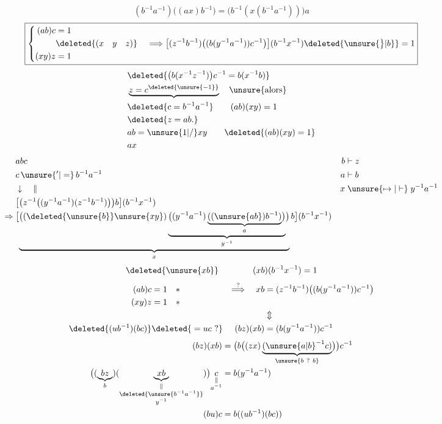 \[
\boxed{(b^{-1}a^{-1})\bigl((ax)b^{-1}\bigr)
=\bigl(b^{-1}(x(b^{-1}a^{-1}))\bigr)a}
\]
\[
\boxed{\left\{\begin{aligned}
(ab)c&=1\\
&\deleted{(x\quad y\quad z)}\\
(xy)z&=1
\end{aligned}\right.\quad\Longrightarrow
\bigl[(z^{-1}b^{-1})\bigl((b(y^{-1}a^{-1}))c^{-1}\bigr)\bigr](b^{-1}x^{-1})\deleted{\unsure{\big\}|b}}=1}
\]
\[
\begin{aligned}
&\deleted{\bigl(b(x^{-1}z^{-1})\bigr)c^{-1}=b(x^{-1}b)}\\
&\underbrace{z=c^{\deleted{\unsure{-1}}}}\quad\unsure{\text{alors}}\\
&\deleted{c=b^{-1}a^{-1}}\qquad(ab)(xy)=1\\
&\deleted{z=ab.}\\
&ab=\unsure{1|/}xy\qquad\deleted{(ab)(xy)=1}\\
&ax
\end{aligned}
\]
\[
\begin{aligned}
&abc&b&\mathrel{\vdash}z\\
&c\,\unsure{{}^{\prime}|=}\,b^{-1}a^{-1}&a&\mathrel{\vdash}b\\
&\downarrow\quad\|&x&\mathrel{\unsure{\mapsto|\vdash}}y^{-1}a^{-1}\\
&\bigl[\bigl(z^{-1}\bigl((y^{-1}a^{-1})(z^{-1}b^{-1})\bigr)\bigr)b\bigr](b^{-1}x^{-1})\\
\Rightarrow{}&
\bigl[\underbrace{\bigl((\deleted{\unsure{b}}\unsure{xy})\underbrace{\bigl((y^{-1}a^{-1})\underbrace{((\unsure{ab})b^{-1})}_{a}\bigr)}_{y^{-1}}\bigr)}_{x}b\bigr](b^{-1}x^{-1})
\end{aligned}
\]
\[
\deleted{\unsure{xb}}\qquad\qquad(xb)(b^{-1}x^{-1})=1
\]
\[
\begin{aligned}
(ab)c&=1\quad *&\overset{?}{\Longrightarrow}\quad xb&=(z^{-1}b^{-1})\bigl((b(y^{-1}a^{-1}))c^{-1}\bigr)\\
(xy)z&=1\quad *&&\\
&&&\Updownarrow\\
\deleted{(ub^{-1})(bc)}&\deleted{{}=uc\ ?}&(bz)(xb)&=(b(y^{-1}a^{-1}))c^{-1}
\end{aligned}
\]
\[
\begin{aligned}
(bz)(xb)&=\bigl(b\bigl((zx)\underbrace{({\unsure{a|b}}^{-1}c)}_{\unsure{b\ ?\ b}}\bigr)\bigr)c^{-1}\\
\bigl((\underbrace{bz}_{b})(\underbrace{xb}_{\substack{\|\\\deleted{\unsure{b^{-1}a^{-1}}}\\y^{-1}}})\bigr)\underset{\substack{\|\\a^{-1}}}{c}&=b(y^{-1}a^{-1})\\
(bu)c&=b((ub^{-1})(bc))
\end{aligned}
\]
